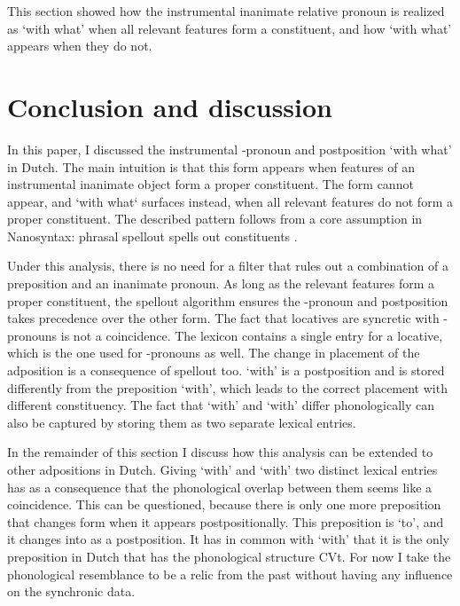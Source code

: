 \documentclass[12pt]{article}
\begin{document}
This section showed how the instrumental inanimate relative pronoun is realized as  `with what' when all relevant features form a constituent, and how  `with what' appears when they do not.



\section{Conclusion and discussion}\label{sec:conclusion}

In this paper, I discussed the instrumental -pronoun and postposition  `with what' in Dutch. The main intuition is that this form appears when features of an instrumental inanimate object form a proper constituent. The form cannot appear, and  `with what` surfaces instead, when all relevant features do not form a proper constituent. The described pattern follows from a core assumption in Nanosyntax: phrasal spellout spells out constituents \citep{starke2009}.

Under this analysis, there is no need for a filter that rules out a combination of a preposition and an inanimate pronoun. As long as the relevant features form a proper constituent, the spellout algorithm ensures the -pronoun and postposition takes precedence over the other form. The fact that locatives are syncretic with -pronouns is not a coincidence. The lexicon contains a single entry for a locative, which is the one used for -pronouns as well. The change in placement of the adposition is a consequence of spellout too.  `with' is a postposition and is stored differently from the preposition  `with', which leads to the correct placement with different constituency. The fact that  `with' and  `with' differ phonologically can also be captured by storing them as two separate lexical entries.

In the remainder of this section I discuss how this analysis can be extended to other adpositions in Dutch. Giving  `with' and  `with' two distinct lexical entries has as a consequence that the phonological overlap between them seems like a coincidence. This can be questioned, because there is only one more preposition that changes form when it appears postpositionally. This preposition is  `to', and it changes into  as a postposition. It has in common with  `with' that it is the only preposition in Dutch that has the phonological structure CVt. For now I take the phonological resemblance to be a relic from the past without having any influence on the synchronic data.
\end{document}

